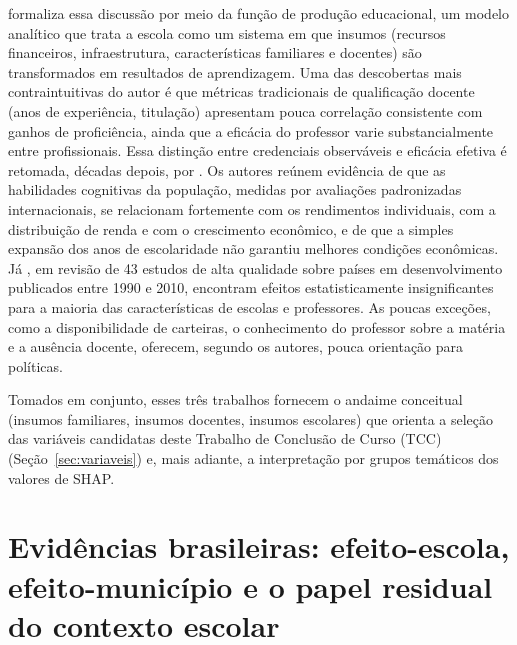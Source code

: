  formaliza essa discussão por meio da
função de produção educacional, um modelo analítico que trata a escola como
um sistema em que insumos (recursos financeiros, infraestrutura,
características familiares e docentes) são transformados em resultados de
aprendizagem. Uma das descobertas mais contraintuitivas do autor é que
métricas tradicionais de qualificação docente (anos de experiência,
titulação) apresentam pouca correlação consistente com ganhos de
proficiência, ainda que a eficácia do professor varie substancialmente
entre profissionais. Essa distinção entre credenciais observáveis e
eficácia efetiva é retomada, décadas depois, por
. Os autores reúnem evidência de que as
habilidades cognitivas da população, medidas por avaliações padronizadas
internacionais, se relacionam fortemente com os rendimentos individuais,
com a distribuição de renda e com o crescimento econômico, e de que a
simples expansão dos anos de escolaridade não garantiu melhores condições
econômicas. Já , em revisão de 43 estudos de
alta qualidade sobre países em desenvolvimento publicados entre 1990 e
2010, encontram efeitos estatisticamente insignificantes para a maioria das
características de escolas e professores. As poucas exceções, como a
disponibilidade de carteiras, o conhecimento do professor sobre a matéria e
a ausência docente, oferecem, segundo os autores, pouca orientação para
políticas.

Tomados em conjunto, esses três trabalhos fornecem o andaime conceitual
(insumos familiares, insumos docentes, insumos escolares) que orienta a
seleção das variáveis candidatas deste Trabalho de Conclusão de Curso (TCC) (Seção~\ref{sec:variaveis}) e,
mais adiante, a interpretação por grupos temáticos dos valores de SHAP.

\section{Evidências brasileiras: efeito-escola, efeito-município e o papel residual do contexto escolar}
\label{sec:evidencias-brasileiras}

